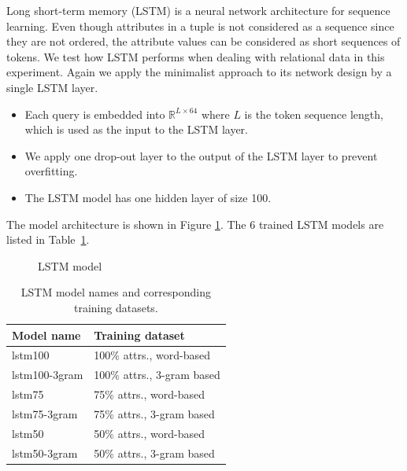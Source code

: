 Long short-term memory (LSTM) is a neural network architecture for sequence learning. Even though attributes in a tuple is not considered as a sequence since they are not ordered, the attribute values can be considered as short sequences of tokens. We test how LSTM performs when dealing with relational data in this experiment. Again we apply the minimalist approach to its network design by a single LSTM layer.


\begin{itemize}
	\item Each query is embedded into $\mathbb{R}^{L\times 64}$ where $L$ is the token sequence length, which is used as the input to the LSTM layer.
	\item We apply one drop-out layer to the output of the LSTM layer to prevent overfitting.
	\item The LSTM model has one hidden layer of size 100.
\end{itemize}

The model architecture is shown in Figure \ref{fig:lstm_model}. The 6 trained LSTM models are listed in Table~\ref{tab:trained_lstm_models}.
\begin{figure}[!th]
	\centering
	
	\caption{LSTM model}
	\label{fig:lstm_model}
\end{figure}
\begin{table}[!th]
	\centering
	\begin{tabularx}{0.8\textwidth}{|l|X|}
		\hline
		\textbf{Model name} & \textbf{Training dataset} \\ \hline
		lstm100 & 100\% attrs., word-based \\
		lstm100-3gram & 100\% attrs., 3-gram based \\ 
		lstm75 & 75\% attrs., word-based \\
		lstm75-3gram & 75\% attrs., 3-gram based \\ 
		lstm50 & 50\% attrs., word-based \\
		lstm50-3gram & 50\% attrs., 3-gram based \\ 
		\hline
	\end{tabularx}
	\caption{LSTM model names and corresponding training datasets.}
	\label{tab:trained_lstm_models}
\end{table}


